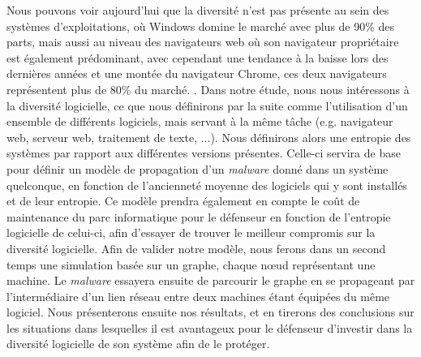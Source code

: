 Nous pouvons voir aujourd’hui que la diversité n’est pas présente au sein des systèmes d’exploitations, où Windows domine le marché avec plus de 90\% des parts, mais aussi au niveau des navigateurs web où son navigateur propriétaire est également prédominant, avec cependant une tendance à la baisse lors des dernières années et une montée du navigateur Chrome, ces deux navigateurs représentent plus de 80\% du marché. \cite{netMarketShare}. 
Dans notre étude, nous nous intéressons à la diversité logicielle, ce que nous définirons par la suite comme l'utilisation d'un ensemble de différents logiciels, mais servant à la même tâche (e.g. navigateur web, serveur web, traitement de texte, ...). Nous définirons alors une entropie des systèmes par rapport aux différentes versions présentes. Celle-ci servira de base pour définir un modèle de propagation d'un \textit{malware} donné dans un système quelconque, en fonction de l'ancienneté moyenne des logiciels qui y sont installés et de leur entropie. Ce modèle prendra également en compte le coût de maintenance du parc informatique pour le défenseur en fonction de l'entropie logicielle de celui-ci, afin d'essayer de trouver le meilleur compromis sur la diversité logicielle.
Afin de valider notre modèle, nous ferons dans un second temps une simulation basée sur un graphe, chaque nœud représentant une machine. Le \textit{malware} essayera ensuite de parcourir le graphe en se propageant par l'intermédiaire d'un lien réseau entre deux machines étant équipées du même logiciel. Nous présenterons ensuite nos résultats, et en tirerons des conclusions sur les situations dans lesquelles il est avantageux pour le défenseur d'investir dans la diversité logicielle de son système afin de le protéger.
